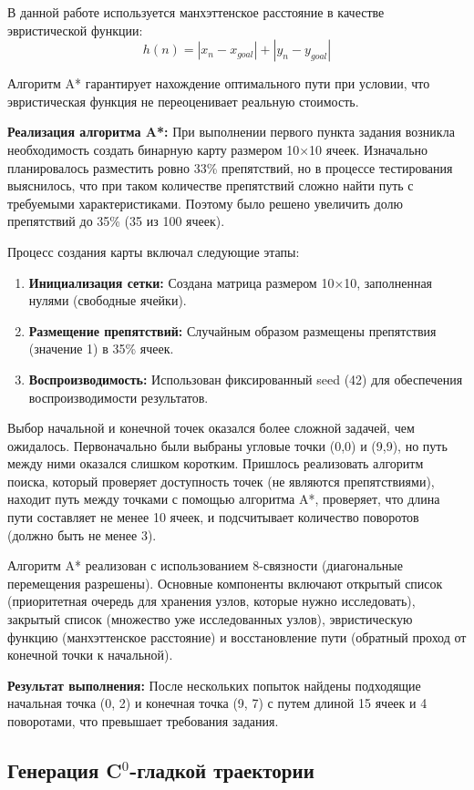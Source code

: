 В данной работе используется манхэттенское расстояние в качестве эвристической функции:
$$h(n) = |x_n - x_{goal}| + |y_n - y_{goal}|$$

Алгоритм A* гарантирует нахождение оптимального пути при условии, что эвристическая функция не переоценивает реальную стоимость.

\textbf{Реализация алгоритма A*:} При выполнении первого пункта задания возникла необходимость создать бинарную карту размером 10×10 ячеек. Изначально планировалось разместить ровно 33\% препятствий, но в процессе тестирования выяснилось, что при таком количестве препятствий сложно найти путь с требуемыми характеристиками. Поэтому было решено увеличить долю препятствий до 35\% (35 из 100 ячеек).

Процесс создания карты включал следующие этапы:
\begin{enumerate}
\item \textbf{Инициализация сетки:} Создана матрица размером 10×10, заполненная нулями (свободные ячейки).
\item \textbf{Размещение препятствий:} Случайным образом размещены препятствия (значение 1) в 35\% ячеек.
\item \textbf{Воспроизводимость:} Использован фиксированный seed (42) для обеспечения воспроизводимости результатов.
\end{enumerate}

Выбор начальной и конечной точек оказался более сложной задачей, чем ожидалось. Первоначально были выбраны угловые точки (0,0) и (9,9), но путь между ними оказался слишком коротким. Пришлось реализовать алгоритм поиска, который проверяет доступность точек (не являются препятствиями), находит путь между точками с помощью алгоритма A*, проверяет, что длина пути составляет не менее 10 ячеек, и подсчитывает количество поворотов (должно быть не менее 3).

Алгоритм A* реализован с использованием 8-связности (диагональные перемещения разрешены). Основные компоненты включают открытый список (приоритетная очередь для хранения узлов, которые нужно исследовать), закрытый список (множество уже исследованных узлов), эвристическую функцию (манхэттенское расстояние) и восстановление пути (обратный проход от конечной точки к начальной).

\textbf{Результат выполнения:} После нескольких попыток найдены подходящие начальная точка (0, 2) и конечная точка (9, 7) с путем длиной 15 ячеек и 4 поворотами, что превышает требования задания.

\subsection{Генерация C$^0$-гладкой траектории}

